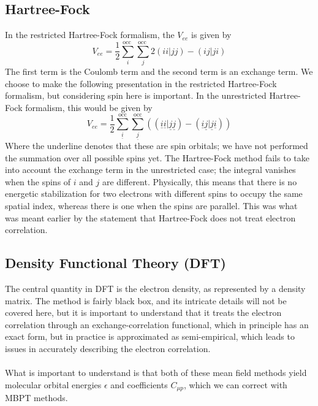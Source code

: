 \documentclass[12pt]{caltech_thesis}
\begin{document}
\subsection{Hartree-Fock}
In the restricted Hartree-Fock formalism, the $V_{ee}$ is given by
\begin{equation}
    V_{ee} = \frac{1}{2} \sum_i^{\text {occ }} \sum_j^{\text {occ }} 2(ii|jj) - (ij|ji)
\end{equation}
The first term is the Coulomb term and the second term is an exchange term. We choose to make the following presentation in the restricted Hartree-Fock formalism, but considering spin here is important. In the unrestricted Hartree-Fock formalism, this would be given by
\begin{equation}
    V_{ee} = \frac{1}{2} \sum_{\underline{i}}^{\text{occ}} \sum_{\underline{j}}^{\text{occ}} \left( (\underline{i}\underline{i}|\underline{j}\underline{j}) - (\underline{i}\underline{j}|\underline{j}\underline{i}) \right)
\end{equation}
Where the underline denotes that these are spin orbitals; we have not performed the summation over all possible spins yet. The Hartree-Fock method fails to take into account the exchange term in the unrestricted case; the integral vanishes when the spins of $i$ and $j$ are different. Physically, this means that there is no energetic stabilization for two electrons with different spins to occupy the same spatial index, whereas there is one when the spins are parallel. This was what was meant earlier by the statement that Hartree-Fock does not treat electron correlation.
\subsection{Density Functional Theory (DFT)}
The central quantity in DFT is the electron density, as represented by a density matrix. The method is fairly black box, and its intricate details will not be covered here, but it is important to understand that it treats the electron correlation through an exchange-correlation functional, which in principle has an exact form, but in practice is approximated as semi-empirical, which leads to issues in accurately describing the electron correlation.\\\\
What is important to understand is that both of these mean field methods yield molecular orbital energies $\epsilon$ and coefficients $C_{\mu p}$, which we can correct with MBPT methods.
\end{document}

